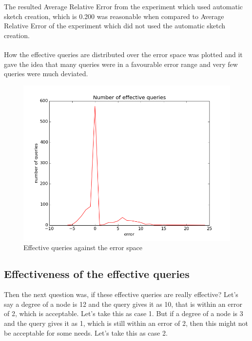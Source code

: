\documentclass[12pt]{report}
\numberwithin{figure}{section}
\numberwithin{table}{section}
\begin{document}
The resulted Average Relative Error from the experiment which used automatic sketch creation, which is 0.200 was reasonable when compared to Average Relative Error  of the experiment which did not used the automatic sketch creation. 

\paragraph{}

How the effective queries are distributed over the error space was plotted and it gave the idea that many queries were in a favourable error range and very few queries were much deviated.

\begin{figure}[H]
\centering
\includegraphics[scale=0.6]{images/deviation-plot-AS-2init-2scale-0t-n1000-e10000-sketches-811-821-823-827-829-839plot}
\caption{ Effective queries against the error space }
\end{figure}

\subsection{Effectiveness of the effective queries }

Then the next question was, if these effective queries are really effective? Let's say a degree of a node is 12 and the query gives it as 10, that is within an error of 2, which is acceptable. Let's take this as case 1. But if a degree of a node is 3 and the query gives it as 1, which is still within an error of 2, then this might not be acceptable for some needs. Let's take this as case 2.
\end{document}
